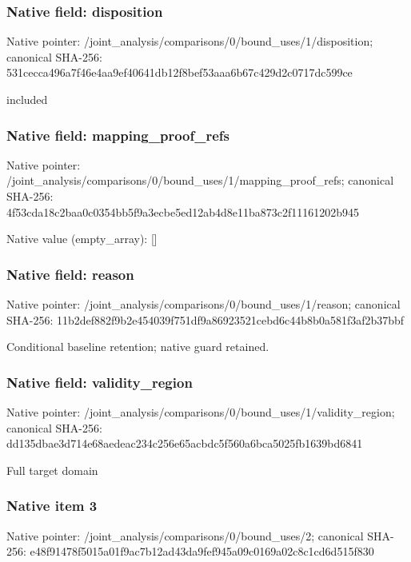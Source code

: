 \documentclass[10pt,a4paper]{article}
\begin{document}
\subsubsection{Native field: disposition}
Native pointer: /joint\_\allowbreak{}analysis/comparisons/0/bound\_\allowbreak{}uses/1/disposition; canonical SHA-256: 531cecca496a7f46e4aa9ef40641db12f8bef53aaa6b67c429d2c0717dc599ce

\begingroup\raggedright\sloppy included\par\endgroup

\subsubsection{Native field: mapping\_\allowbreak{}proof\_\allowbreak{}refs}
Native pointer: /joint\_\allowbreak{}analysis/comparisons/0/bound\_\allowbreak{}uses/1/mapping\_\allowbreak{}proof\_\allowbreak{}refs; canonical SHA-256: 4f53cda18c2baa0c0354bb5f9a3ecbe5ed12ab4d8e11ba873c2f11161202b945

Native value (empty\_\allowbreak{}array): []

\subsubsection{Native field: reason}
Native pointer: /joint\_\allowbreak{}analysis/comparisons/0/bound\_\allowbreak{}uses/1/reason; canonical SHA-256: 11b2def882f9b2e454039f751df9a86923521cebd6c44b8b0a581f3af2b37bbf

\begingroup\raggedright\sloppy Conditional baseline retention;\allowbreak{} native guard retained.\par\endgroup

\subsubsection{Native field: validity\_\allowbreak{}region}
Native pointer: /joint\_\allowbreak{}analysis/comparisons/0/bound\_\allowbreak{}uses/1/validity\_\allowbreak{}region; canonical SHA-256: dd135dbae3d714e68aedeac234c256e65acbdc5f560a6bca5025fb1639bd6841

\begingroup\raggedright\sloppy Full target domain\par\endgroup

\subsubsection{Native item 3}
Native pointer: /joint\_\allowbreak{}analysis/comparisons/0/bound\_\allowbreak{}uses/2; canonical SHA-256: e48f91478f5015a01f9ac7b12ad43da9fef945a09c0169a02c8c1cd6d515f830
\end{document}
